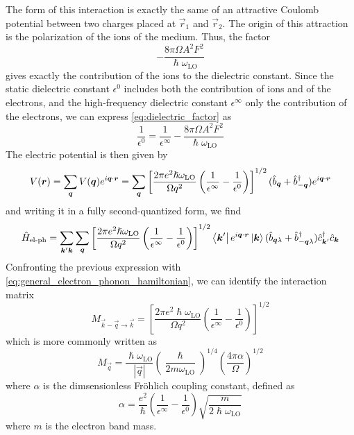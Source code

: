 The form of this interaction is exactly the same of an attractive Coulomb potential between two charges placed at $\vec{r}_1$ and $\vec{r}_2$. The origin of this attraction is the polarization of the ions of the medium. Thus, the factor
\begin{equation} \label{eq:dielectric_factor}
    - \frac{8\pi \Omega A^2 F^2}{\hslash \omega_\text{LO}}
\end{equation}
gives exactly the contribution of the ions to the dielectric constant. Since the static dielectric constant $\epsilon^0$ includes both the contribution of ions and of the electrons, and the high-frequency dielectric constant $\epsilon^\infty$ only the contribution of the electrons, we can express \cref{eq:dielectric_factor} as
\begin{equation}
    \frac{1}{\epsilon^0} = \frac{1}{\epsilon^\infty} - \frac{8\pi \Omega A^2 F^2}{\hslash \omega_\text{LO}}
\end{equation}
The electric potential is then given by
\begin{equation}
    V(\mathbf{\boldsymbol{r}}) = \sum_{\mathbf{\boldsymbol{q}}} V(\mathbf{\boldsymbol{q}}) e^{i\mathbf{\boldsymbol{q}} \cdot \mathbf{\boldsymbol{r}}}
    =  \sum_{\mathbf{\boldsymbol{q}}} \left[ \frac{2\pi e^2 \hslash \omega_\text{LO}}{\Omega q^2} \left( \frac{1}{\epsilon^\infty} - \frac{1}{\epsilon^0} \right) \right]^{1/2} (\hat{b}_{\mathbf{\boldsymbol{q}}} + \hat{b}^\dagger_{-\mathbf{\boldsymbol{q}}}) e^{i\mathbf{\boldsymbol{q}}\cdot\mathbf{\boldsymbol{r}}}
\end{equation}
and writing it in a fully second-quantized form, we find
\begin{equation}
    \hat{H}_\text{el-ph} =  \sum_{\mathbf{\boldsymbol{k}}'\mathbf{\boldsymbol{k}}} \sum_{\mathbf{\boldsymbol{q}}} \left[ \frac{2\pi e^2 \hslash \omega_\text{LO}}{\Omega q^2} \left( \frac{1}{\epsilon^\infty} - \frac{1}{\epsilon^0} \right) \right]^{1/2} \bra{\mathbf{\boldsymbol{k}}'}e^{i\mathbf{\boldsymbol{q}}\cdot\mathbf{\boldsymbol{r}}}\ket{\mathbf{\boldsymbol{k}}}(\hat{b}_{\mathbf{\boldsymbol{q}}\lambda} + \hat{b}^\dagger_{-\mathbf{\boldsymbol{q}}\lambda}) \hat{c}^\dagger_{\mathbf{\boldsymbol{k}}'}\hat{c}_{\mathbf{\boldsymbol{k}}}
\end{equation}
Confronting the previous expression with \cref{eq:general_electron_phonon_hamiltonian}, we can identify the interaction matrix
\begin{equation}
    M_{\vec{k}-\vec{q} \rightarrow \vec{k}} =  \left[ \frac{2\pi e^2 \hslash \omega_\text{LO}}{\Omega q^2} \left( \frac{1}{\epsilon^\infty} - \frac{1}{\epsilon^0} \right) \right]^{1/2}
\end{equation}
which is more commonly written as
\begin{equation} \label{eq:frohlich_matrix}
    M_\vec{q} =  \frac{\hslash \omega_\text{LO}}{|\vec{q}|} \left(\frac{\hslash}{2m\omega_\text{LO}}\right)^{1/4} \left(\frac{4\pi\alpha}{\Omega}\right)^{1/2}
\end{equation}
where $\alpha$ is the dimsensionless Fr\"{o}hlich coupling constant,  defined as
\begin{equation}
    \alpha = \frac{e^2}{\hslash} \left( \frac{1}{\epsilon^\infty} - \frac{1}{\epsilon^0} \right) \sqrt{\frac{m}{2\hslash\omega_\text{LO}}}
\end{equation}
where $m$ is the electron band mass.

